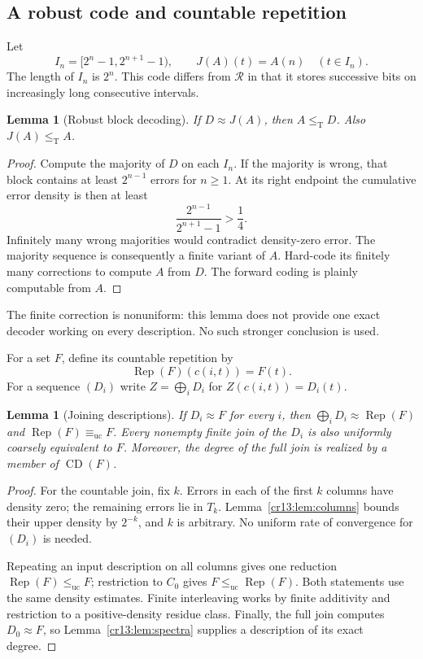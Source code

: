 \documentclass[11pt,letterpaper]{article}
\newtheorem{lemma}[theorem]{Lemma}
\theoremstyle{definition}
\theoremstyle{remark}\newtheorem{remark}[theorem]{Remark}
\numberwithin{equation}{section}
\newcommand{\leT}{\leq_{\mathrm T}}
\newcommand{\leuc}{\leq_{\mathrm{uc}}}
\newcommand{\equc}{\equiv_{\mathrm{uc}}}
\newcommand{\CD}{\operatorname{CD}}
\newcommand{\Rc}{\mathcal R}
\newcommand{\Rep}{\operatorname{Rep}}
\begin{document}
\subsection{A robust code and countable repetition}
Let
\[
       I_n=[2^n-1,2^{n+1}-1),\qquad
       J(A)(t)=A(n)\quad(t\in I_n).
\]
The length of $I_n$ is $2^n$. This code differs from $\Rc$ in that it stores successive bits on increasingly long consecutive intervals.

\begin{lemma}[Robust block decoding]\label{cr13:lem:robust}
If $D\approx J(A)$, then $A\leT D$. Also $J(A)\leT A$.
\end{lemma}
\begin{proof}
Compute the majority of $D$ on each $I_n$. If the majority is wrong, that block contains at least $2^{n-1}$ errors for $n\ge1$. At its right endpoint the cumulative error density is then at least
\[
                  \frac{2^{n-1}}{2^{n+1}-1}>\frac14.
\]
Infinitely many wrong majorities would contradict density-zero error. The majority sequence is consequently a finite variant of $A$. Hard-code its finitely many corrections to compute $A$ from $D$. The forward coding is plainly computable from $A$.
\end{proof}
The finite correction is nonuniform: this lemma does not provide one exact decoder working on every description. No such stronger conclusion is used.

For a set $F$, define its countable repetition by
\[
                    \Rep(F)(c(i,t))=F(t).
\]
For a sequence $(D_i)$ write $Z=\bigoplus_iD_i$ for $Z(c(i,t))=D_i(t)$.

\begin{lemma}[Joining descriptions]\label{cr13:lem:joincoarse}
If $D_i\approx F$ for every $i$, then $\bigoplus_iD_i\approx\Rep(F)$ and $\Rep(F)\equc F$. Every nonempty finite join of the $D_i$ is also uniformly coarsely equivalent to $F$. Moreover, the degree of the full join is realized by a member of $\CD(F)$.
\end{lemma}
\begin{proof}
For the countable join, fix $k$. Errors in each of the first $k$ columns have density zero; the remaining errors lie in $T_k$. Lemma~\ref{cr13:lem:columns} bounds their upper density by $2^{-k}$, and $k$ is arbitrary. No uniform rate of convergence for $(D_i)$ is needed.

Repeating an input description on all columns gives one reduction $\Rep(F)\leuc F$; restriction to $C_0$ gives $F\leuc\Rep(F)$. Both statements use the same density estimates. Finite interleaving works by finite additivity and restriction to a positive-density residue class. Finally, the full join computes $D_0\approx F$, so Lemma~\ref{cr13:lem:spectra} supplies a description of its exact degree.
\end{proof}
\end{document}
